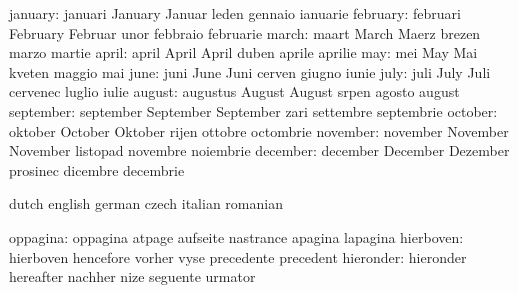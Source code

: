                   january: januari                   January
                           Januar                    leden
                           gennaio                   ianuarie
                 february: februari                  February
                           Februar                   unor
                           febbraio                  februarie
                    march: maart                     March
                           Maerz                     brezen
                           marzo                     martie
                    april: april                     April
                           April                     duben
                           aprile                    aprilie
                      may: mei                       May
                           Mai                       kveten
                           maggio                    mai
                     june: juni                      June
                           Juni                      cerven
                           giugno                    iunie
                     july: juli                      July
                           Juli                      cervenec
                           luglio                    iulie
                   august: augustus                  August
                           August                    srpen
                           agosto                    august
                september: september                 September
                           September                 zari
                           settembre                 septembrie
                  october: oktober                   October
                           Oktober                   rijen
                           ottobre                   octombrie
                 november: november                  November
                           November                  listopad
                           novembre                  noiembrie
                 december: december                  December
                           Dezember                  prosinec
                           dicembre                  decembrie
\stopvariables


\startvariables            dutch                     english
                           german                    czech
                           italian                   romanian

                 oppagina: oppagina                  atpage
                           aufseite                  nastrance
                           apagina                   lapagina
                hierboven: hierboven                 hencefore
                           vorher                    vyse
                           precedente                precedent
                hieronder: hieronder                 hereafter
                           nachher                   nize
                           seguente                  urmator

